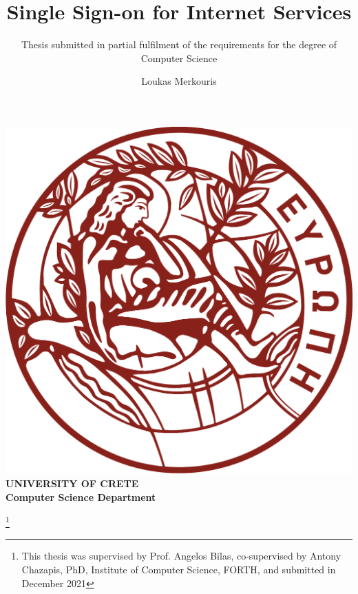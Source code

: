 \documentclass[acmsmall,screen,10pt,nonacm]{acmart}
\begin{document}
\begin{center}
\includegraphics[scale=0.2]{figures/UoC_logo.png}\\
\textcolor{UoC}{\textbf{UNIVERSITY OF CRETE}}\\
\textcolor{UoC}{\textbf{Computer Science Department}}
\vspace{3em}
\end{center}

\title{Single Sign-on for Internet Services}
\subtitle{Thesis submitted in partial fulfilment of the requirements for the degree of Computer Science}

\thanks{\small{This thesis was supervised by Prof. Angelos Bilas, co-supervised by Antony Chazapis, PhD, Institute of Computer Science, FORTH, and submitted in December 2021}}

\author{Loukas Merkouris}
\renewcommand{\shortauthors}{L. Merkouris}
\end{document}
